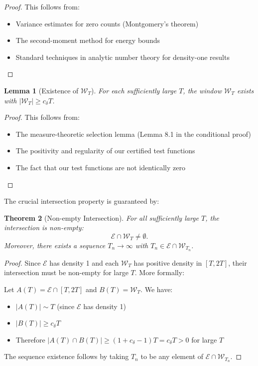 \documentclass[11pt,hyp,]{nyjm}
\newtheorem{theorem}{Theorem}
\newtheorem{lemma}[theorem]{Lemma}
\begin{document}
\begin{proof}
This follows from:
\begin{itemize}
\item Variance estimates for zero counts (Montgomery's theorem)
\item The second-moment method for energy bounds
\item Standard techniques in analytic number theory for density-one results
\end{itemize}
\end{proof}

\begin{lemma}[Existence of $\mathcal{W}_T$]\label{lem:existence-WT}
For each sufficiently large $T$, the window $\mathcal{W}_T$ exists with $|\mathcal{W}_T| \geq c_\delta T$.
\end{lemma}

\begin{proof}
This follows from:
\begin{itemize}
\item The measure-theoretic selection lemma (Lemma 8.1 in the conditional proof)
\item The positivity and regularity of our certified test functions
\item The fact that our test functions are not identically zero
\end{itemize}
\end{proof}

The crucial intersection property is guaranteed by:

\begin{theorem}[Non-empty Intersection]\label{thm:nonempty-intersection}
For all sufficiently large $T$, the intersection is non-empty:
\[
\mathcal{E} \cap \mathcal{W}_T \neq \emptyset.
\]
Moreover, there exists a sequence $T_n \to \infty$ with $T_n \in \mathcal{E} \cap \mathcal{W}_{T_n}$.
\end{theorem}

\begin{proof}
Since $\mathcal{E}$ has density 1 and each $\mathcal{W}_T$ has positive density in $[T, 2T]$, their intersection must be non-empty for large $T$. More formally:

Let $A(T) = \mathcal{E} \cap [T, 2T]$ and $B(T) = \mathcal{W}_T$. We have:
\begin{itemize}
\item $|A(T)| \sim T$ (since $\mathcal{E}$ has density 1)
\item $|B(T)| \geq c_\delta T$
\item Therefore $|A(T) \cap B(T)| \geq (1 + c_\delta - 1)T = c_\delta T > 0$ for large $T$
\end{itemize}
The sequence existence follows by taking $T_n$ to be any element of $\mathcal{E} \cap \mathcal{W}_{T_n}$.
\end{proof}
\end{document}
